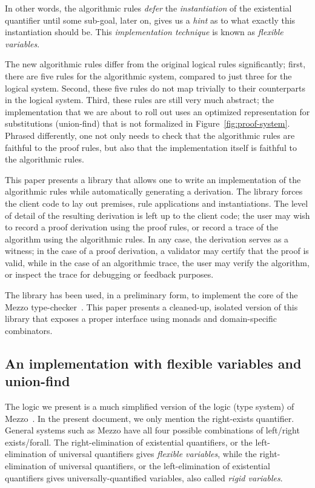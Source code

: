 \documentclass{easychair}
\newcommand{\fref}[1]{Figure~\ref{fig:#1}}
\begin{document}
In other words, the algorithmic rules \emph{defer} the \emph{instantiation} of
the existential quantifier until some sub-goal, later on, gives us a \emph{hint}
as to what exactly this instantiation should be. This \emph{implementation
technique} is known as \emph{flexible variables}.

The new algorithmic rules differ from the original logical rules significantly;
first, there are five rules for the algorithmic system, compared to just three
for the logical system. Second, these five rules do not map trivially to their
counterparts in the logical system. Third, these rules are still very much
abstract; the implementation that we are about to roll out uses an
optimized representation for substitutions (union-find) that is not formalized
in \fref{proof-system}. Phrased differently, one not only needs to check that
the algorithmic rules are faithful to the proof rules, but also that the
implementation itself is faithful to the algorithmic rules.

This paper presents a library that allows one to write an implementation of the
algorithmic rules while automatically generating a derivation. The library
forces the client code to lay out premises, rule applications and
instantiations. The level of detail of the resulting derivation is left up to
the client code; the user may wish to record a proof derivation using the proof
rules, or record a trace of the algorithm using the algorithmic rules.  In any
case, the derivation serves as a witness; in the case of a proof derivation, a
validator may certify that the proof is valid, while in the case of an
algorithmic trace, the user may verify the algorithm, or inspect the trace for
debugging or feedback purposes.

The library has been used, in a preliminary form, to implement the core of the
Mezzo type-checker~\cite{protzenko-phd-14}. This paper presents a cleaned-up,
isolated version of this library that exposes a proper interface using monads
and domain-specific combinators.

\subsection{An implementation with flexible variables and union-find}

The logic we present is a much simplified version of the logic (type system) of
Mezzo~\cite{pottier-protzenko-13}. In the present document, we only mention the
right-exists quantifier. General systems such as Mezzo have all four possible
combinations of left/right exists/forall.
%
The right-elimination of existential quantifiers, or the left-elimination of
universal quantifiers gives \emph{flexible variables}, while the
right-elimination of universal quantifiers, or the left-elimination of
existential quantifiers gives universally-quantified variables, also called
\emph{rigid variables}.
\end{document}
